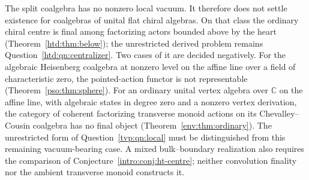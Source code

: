 The split coalgebra has no nonzero local vacuum. It
therefore does not settle existence for coalgebras of
unital flat chiral algebras. On that class the ordinary
chiral centre is final among factorizing actors bounded
above by the heart (Theorem~\ref{htd:thm:below}); the
unrestricted derived problem remains
Question~\ref{htd:qn:centralizer}. Two cases of it are decided
negatively. For the algebraic Heisenberg coalgebra at nonzero
level on the affine line over a field of characteristic zero,
the pointed-action functor is not representable
(Theorem~\ref{pso:thm:sphere}). For an ordinary unital vertex
algebra over \(\mathbb C\) on the affine line, with algebraic
states in degree zero and a nonzero vertex derivation, the
category of coherent factorizing transverse monoid actions on
its Chevalley--Cousin coalgebra has no final object
(Theorem~\ref{env:thm:ordinary}). The unrestricted form
of Question~\ref{tvp:qn:local} must be distinguished
from this remaining vacuum-bearing case. A mixed
bulk--boundary realization also requires the comparison
of Conjecture~\ref{intro:conj:ht-centre}; neither
convolution finality nor the ambient transverse monoid
constructs it.

